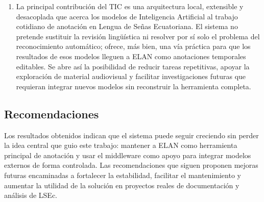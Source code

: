 \begin{enumerate}
    \item La principal contribución del TIC es una arquitectura local, extensible y desacoplada que acerca los modelos de Inteligencia Artificial al trabajo cotidiano de anotación en Lengua de Señas Ecuatoriana. El sistema no pretende sustituir la revisión lingüística ni resolver por sí solo el problema del reconocimiento automático; ofrece, más bien, una vía práctica para que los resultados de esos modelos lleguen a ELAN como anotaciones temporales editables. Se abre así la posibilidad de reducir tareas repetitivas, apoyar la exploración de material audiovisual y facilitar investigaciones futuras que requieran integrar nuevos modelos sin reconstruir la herramienta completa.
\end{enumerate}

\vspace{1\baselineskip}

\subsection{Recomendaciones}

Los resultados obtenidos indican que el sistema puede seguir creciendo sin perder la idea central que guio este trabajo: mantener a ELAN como herramienta principal de anotación y usar el middleware como apoyo para integrar modelos externos de forma controlada. Las recomendaciones que siguen proponen mejoras futuras encaminadas a fortalecer la estabilidad, facilitar el mantenimiento y aumentar la utilidad de la solución en proyectos reales de documentación y análisis de LSEc.


